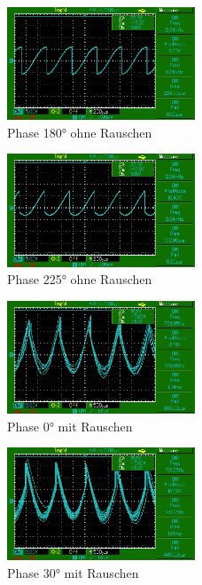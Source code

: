 \begin{figure}
    \centering
    \includegraphics[width=0.5\textwidth]{bilder/MAP003.png}
    \caption{Phase 180° ohne Rauschen}        
    \label{fig:MAP003}
\end{figure}

\begin{figure}
    \centering
    \includegraphics[width=0.5\textwidth]{bilder/MAP004.png}
    \caption{Phase 225° ohne Rauschen}        
    \label{fig:MAP004}
\end{figure}

\begin{figure}
    \centering
    \includegraphics[width=0.5\textwidth]{bilder/MAP007.png}
    \caption{Phase 0° mit Rauschen}        
    \label{fig:MAP007}
\end{figure}

 \begin{figure}
     \centering
     \includegraphics[width=0.5\textwidth]{bilder/MAP008.png}
     \caption{Phase 30° mit Rauschen}        
     \label{fig:MAP008}
 \end{figure}

